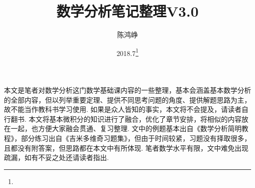 \documentclass[11pt,UTF8]{ctexart}
\title{数学分析笔记整理V3.0}
\author{陈鸿峥}
\date{2018.7\footnote{\text{Build 20180708}}}%
\renewcommand{\thefootnote}{\fnsymbol{footnote}}
\begin{document}
\maketitle
\renewcommand{\thefootnote}{\arabic{footnote}}
\setcounter{footnote}{0}

\setcounter{tocdepth}{2}%
\tableofcontents
\bigskip\bigskip\bigskip

\par 本文是笔者对数学分析这门数学基础课内容的一些整理，基本会涵盖基本数学分析的全部内容，但以列举重要定理、提供不同思考问题的角度、提供解题思路为主，故不能当作教科书学习使用. 如果是众人皆知的事实，本文将不会提及，请读者自行翻书. 本文将基本微积分的知识进行了融合，优化了章节安排，将相似的内容放在一起，也方便大家融会贯通、复习整理. 文中的例题基本出自《数学分析简明教程》，部分练习出自《吉米多维奇习题集》，但由于时间较紧，习题没有择取很多，且都没有附答案，但思路都在本文中有所体现. 笔者数学水平有限，文中难免出现疏漏，如有不妥之处还请读者指出. 










\end{document}
